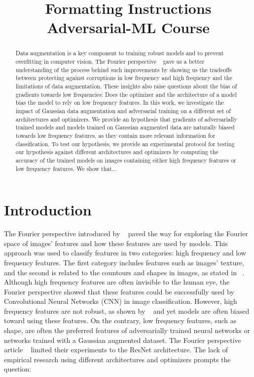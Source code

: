 \documentclass{article}
\title{Formatting Instructions Adversarial-ML Course}
\begin{document}
\maketitle

\begin{abstract}
  Data augmentation is a key component to training robust models and
  to prevent overfitting in computer vision. The Fourier perspective
  ~\citep{yin2020fourier} gave us a better understanding of the
  process behind such improvements by showing us the tradeoffs between
  protecting against corruptions in low frequency and high frequency
  and the limitations of data augmentation. These insights also raise
  questions about the bias of gradients towards low frequencies: Does
  the optimizer and the architecture of a model bias the model to rely
  on low frequency features. In this work, we investigate the impact
  of Gaussian data augmentation and adversarial training on a
  different set of architectures and optimizers. We provide an
  hypothesis that gradients of adversarially trained models and models
  trained on Gaussian augmented data are naturally biased towards low
  frequency features, as they contain more relevant information for
  classification. To test our hypothesis, we provide an experimental
  protocol for testing our hypothesis against different architectures
  and optimizers by computing the accuracy of the trained models on
  images containing either high frequency features or low frequency
  features. We show that... %
\end{abstract}
\section{Introduction}
The Fourier perspective introduced by ~\citep{yin2020fourier} paved
the way for exploring the Fourier space of images’ features and how
these features are used by models. This approach was used to classify
features in two categories: high frequency and low frequency
features. The first category includes features such as images’
texture, and the second is related to the countours and shapes in
images, as stated in ~\citep{krishnamachari2023fourier}. Although high
frequency features are often invisible to the human eye, the Fourier
perspective showed that these features could be successfully used by
Convolutional Neural Networks (CNN) in image classification. However,
high frequency features are not robust, as shown by
~\citep{zhang2019interpreting} and yet models are often biased toward
using these features. On the contrary, low frequency features, such as
shape, are often the preferred features of adversarially trained
neural networks or networks trained with a Gaussian augmented
dataset. The Fourier perspective article ~\citep{yin2020fourier}
limited their experiments to the ResNet architecture. The lack of
empirical research using different architectures and optimizers
prompts the question:
\end{document}
